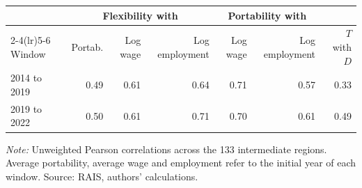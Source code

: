 {\small
\begin{threeparttable}
\begin{tabular}{lrrrrrr}
\toprule
 & \multicolumn{3}{c}{Flexibility with} & \multicolumn{2}{c}{Portability with} & \\
\cmidrule(lr){2-4}\cmidrule(lr){5-6}
Window & Portab. & Log wage & Log employment & Log wage & Log employment & $T$ with $D$ \\
\midrule
2014 to 2019 & 0.49 & 0.61 & 0.64 & 0.71 & 0.57 & 0.33 \\
2019 to 2022 & 0.50 & 0.61 & 0.71 & 0.70 & 0.61 & 0.49 \\
\bottomrule
\end{tabular}
\begin{tablenotes}[flushleft]\footnotesize
\item \textit{Note:} Unweighted Pearson correlations across the 133 intermediate regions. Average portability, average wage and employment refer to the initial year of each window. Source: RAIS, authors' calculations.
\end{tablenotes}
\end{threeparttable}
}
